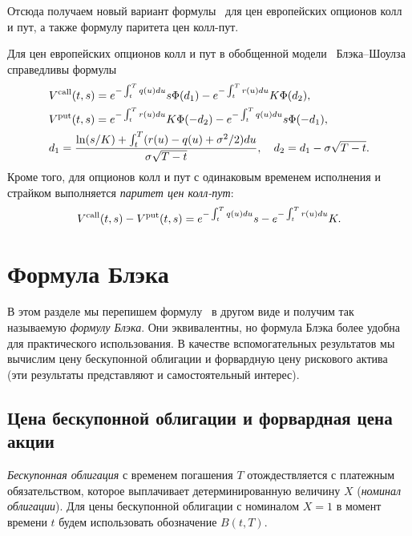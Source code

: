 Отсюда получаем новый вариант формулы \bs\ для цен европейских опционов колл и пут, а также формулу паритета цен колл-пут.

\begin{corollary}
Для цен европейских опционов колл и пут в обобщенной модели \bs\ Блэка--Шоулза справедливы формулы
\begin{equation}
\label{bs2:bs-formula}
\begin{aligned}
&V^{\text{\normalfont call}}(t,s) = e^{-\int_t^T q(u) du} s \Phi(d_1) - e^{-\int_t^T r(u) du} K \Phi(d_2), \\
&V^{\text{\normalfont put}}(t,s) = e^{-\int_t^T r(u) du} K \Phi(-d_2) - e^{-\int_t^T q(u) du} s \Phi(-d_1),\\
&d_1 = \frac{\ln(s/K) + \int_t^T (r(u)-q(u)+\sigma^2/2)du}{\sigma\sqrt{T-t}},\quad
d_2 = d_1 - \sigma\sqrt{T-t}.
\end{aligned}
\end{equation}
Кроме того, для опционов колл и пут с одинаковым временем исполнения и страйком выполняется \emph{паритет цен колл-пут}:
\begin{equation}
\label{10:bs-pc}
V^{\text{\normalfont call}}(t,s) - V^{\text{\normalfont put}}(t,s) = e^{-\int_t^T q(u) du} s - e^{-\int_t^T r(u) du} K.
\end{equation}
\end{corollary}


\section{Формула Блэка}

В этом разделе мы перепишем формулу \bs\ в другом виде и получим так называемую \emph{формулу Блэка}.
Они эквивалентны, но формула Блэка более удобна для практического использования.
В качестве вспомогательных результатов мы вычислим цену бескупонной облигации и форвардную цену рискового актива (эти результаты представляют и самостоятельный интерес).

\subsection{Цена бескупонной облигации и форвардная цена акции}

\begin{definition}
\emph{Бескупонная облигация} с временем погашения $T$  отождествляется с платежным обязательством, которое выплачивает детерминированную величину $X$ (\emph{номинал облигации}).
Для цены бескупонной облигации с номиналом $X=1$ в момент времени $t$ будем использовать обозначение $B(t,T)$. 
\end{definition}

